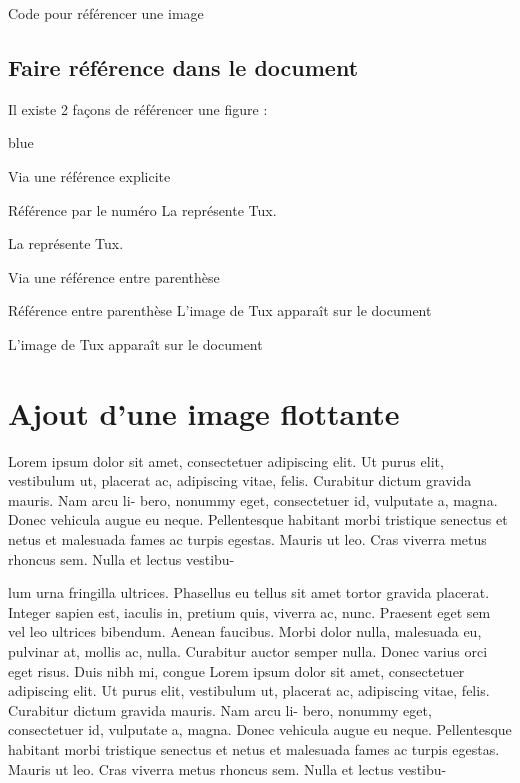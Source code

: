 {
\begin{Latex}{Code pour référencer une image}
\end{Latex}


\subsection{Faire référence dans le document}

Il existe 2 façons de référencer une figure : 

\begin{items}{blue}{\Triangle}
    \item Via une référence explicite
    \begin{Latex}{Référence par le numéro}
La  représente Tux.
\end{Latex}
    La  représente Tux.
    \item Via une référence entre parenthèse
\begin{Latex}{Référence entre parenthèse}
L'image de Tux apparaît sur le document 
\end{Latex}
    L'image de Tux apparaît sur le document 
  \end{items}

\section{Ajout d'une image flottante}

Lorem ipsum dolor sit amet, consectetuer adipiscing elit. Ut purus elit, vestibulum
ut, placerat ac, adipiscing vitae, felis. Curabitur dictum gravida mauris. Nam arcu li-
bero, nonummy eget, consectetuer id, vulputate a, magna. Donec vehicula augue eu
neque. Pellentesque habitant morbi tristique senectus et netus et malesuada fames ac
turpis egestas. Mauris ut leo. Cras viverra metus rhoncus sem. Nulla et lectus vestibu-


lum urna fringilla ultrices. Phasellus eu tellus sit amet tortor gravida placerat. Integer
sapien est, iaculis in, pretium quis, viverra ac, nunc. Praesent eget sem vel leo ultrices
bibendum. Aenean faucibus. Morbi dolor nulla, malesuada eu, pulvinar at, mollis ac,
nulla. Curabitur auctor semper nulla. Donec varius orci eget risus. Duis nibh mi, congue
Lorem ipsum dolor sit amet, consectetuer adipiscing elit. Ut purus elit, vestibulum
ut, placerat ac, adipiscing vitae, felis. Curabitur dictum gravida mauris. Nam arcu li-
bero, nonummy eget, consectetuer id, vulputate a, magna. Donec vehicula augue eu
neque. Pellentesque habitant morbi tristique senectus et netus et malesuada fames ac
turpis egestas. Mauris ut leo. Cras viverra metus rhoncus sem. Nulla et lectus vestibu-


}
